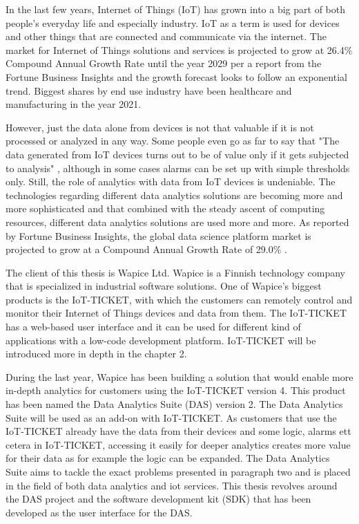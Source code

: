 In the last few years, Internet of Things (IoT) has grown into a big part of both people's everyday life and especially industry. IoT as a term is used for devices and other things that are connected and communicate via the internet. The market for Internet of Things solutions and services is projected to grow at 26.4\% Compound Annual Growth Rate until the year 2029 per a report from the Fortune Business Insights and the growth forecast looks to follow an exponential trend. Biggest shares by end use industry have been healthcare and manufacturing in the year 2021. \cite{Insights2022a}

However, just the data alone from devices is not that valuable if it is not processed or analyzed in any way. Some people even go as far to say that "The data generated from IoT devices turns out to be of value only if it gets subjected to analysis" \cite{Joseph}, although in some cases alarms can be set up with simple thresholds only. Still, the role of analytics with data from IoT devices is undeniable. The technologies regarding different data analytics solutions are becoming more and more sophisticated and that combined with the steady ascent of computing resources, different data analytics solutions are used more and more. As reported by Fortune Business Insights, the global data science platform market is projected to grow at a Compound Annual Growth Rate of 29.0\% \cite{Insights2022}.

The client  of this thesis is Wapice Ltd. Wapice is a Finnish technology company that is specialized in industrial software solutions. One of Wapice's biggest products is the IoT-TICKET, with which the customers can remotely control and monitor their Internet of Things devices and data from them. The IoT-TICKET has a web-based user interface and it can be used for different kind of applications with a low-code development platform. IoT-TICKET will be introduced more in depth in the chapter 2.

During the last year, Wapice has been building a solution that would enable more in-depth analytics for customers using the IoT-TICKET version 4. This product has been named the Data Analytics Suite (DAS) version 2. The Data Analytics Suite will be used as an add-on with IoT-TICKET. As customers that use the IoT-TICKET already have the data from their devices and some logic, alarms ett cetera in IoT-TICKET, accessing it easily for deeper analytics creates more value for their data as for example the logic can be expanded. The Data Analytics Suite aims to tackle the exact problems presented in paragraph two and is placed in the field of both data analytics and iot services. This thesis revolves around the DAS project and the software development kit (SDK) that has been developed as the user interface for the DAS.

